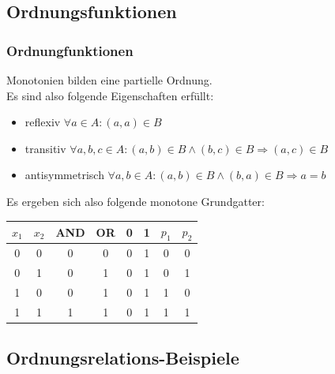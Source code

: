 \documentclass[hyperref={pdfpagelabels=false}]{beamer} %
\begin{document}
  \subsection{Ordnungsfunktionen}
  \begin{frame}%
    \frametitle{Ordnungfunktionen}
    Monotonien bilden eine partielle Ordnung.\\ Es sind also folgende Eigenschaften erfüllt:\\
    \begin{itemize}
      \item reflexiv $\forall a \in A: (a,a) \in B$\\
      \item transitiv $\forall a,b,c \in A: (a,b) \in B \land (b,c) \in B \Rightarrow (a,c) \in B$\\
      \item antisymmetrisch $\forall a,b \in A: (a,b) \in B \land (b,a) \in B \Rightarrow a=b$\\
    \end{itemize}
    Es ergeben sich also folgende monotone Grundgatter:\\
    \begin{tabular}[t]{|cc|c|c|c|c|c|c|} \hline
      $x_1$	& $x_2$	& AND	& OR	& 0	& 1	& $p_1$	& $p_2$\\ \hline
      0	& 0	& 0	& 0	& 0	& 1	& 0	& 0\\
      0	& 1	& 0	& 1	& 0	& 1	& 0	& 1\\
      1	& 0	& 0	& 1	& 0	& 1	& 1	& 0\\
      1	& 1	& 1	& 1	& 0	& 1	& 1	& 1\\ \hline
    \end{tabular}
  \end{frame}

  \subsection{Ordnungsrelations-Beispiele}
\end{document}
